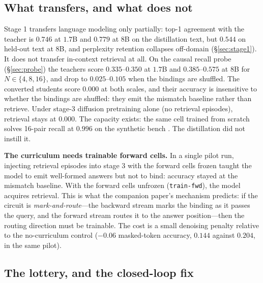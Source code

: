 \documentclass{article}
\newcommand{\trainfwd}{\texttt{train-fwd}}
\begin{document}
\subsection{What transfers, and what does not}\label{sec:transfer}

Stage 1 transfers language modeling only partially: top-1 agreement with the teacher is $0.746$ at $1.7$B and $0.779$ at $8$B on the distillation text, but $0.544$ on held-out text at $8$B, and perplexity retention collapses off-domain (\S\ref{sec:stage1}). It does not transfer in-context retrieval at all. On the causal recall probe (\S\ref{sec:probe}) the teachers score $0.335$--$0.350$ at $1.7$B and $0.385$--$0.575$ at $8$B for $N \in \{4, 8, 16\}$, and drop to $0.025$--$0.105$ when the bindings are shuffled. The converted students score $0.000$ at both scales, and their accuracy is insensitive to whether the bindings are shuffled: they emit the mismatch baseline rather than retrieve. Under stage-3 diffusion pretraining alone (no retrieval episodes), retrieval stays at $0.000$. The capacity exists: the same cell trained from scratch solves 16-pair recall at $0.996$ on the synthetic bench \citep{anatomyrecall}. The distillation did not instill it.

\textbf{The curriculum needs trainable forward cells.} In a single pilot run, injecting retrieval episodes into stage 3 with the forward cells frozen taught the model to emit well-formed answers but not to bind: accuracy stayed at the mismatch baseline. With the forward cells unfrozen (\trainfwd), the model acquires retrieval. This is what the companion paper's mechanism predicts: if the circuit is \emph{mark-and-route}---the backward stream marks the binding as it passes the query, and the forward stream routes it to the answer position---then the routing direction must be trainable. The cost is a small denoising penalty relative to the no-curriculum control ($-0.06$ masked-token accuracy, $0.144$ against $0.204$, in the same pilot).

\subsection{The lottery, and the closed-loop fix}\label{sec:lottery}
\end{document}
